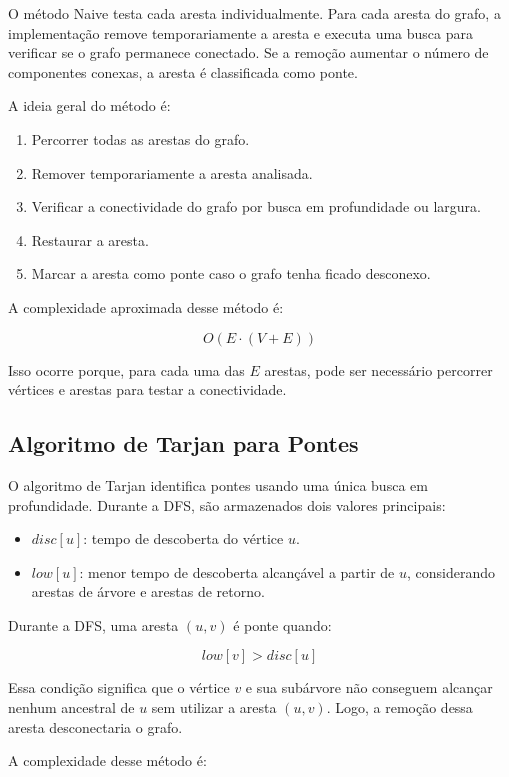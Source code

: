 \documentclass[a4paper,12pt]{article}
\begin{document}
O método Naive testa cada aresta individualmente. Para cada aresta do grafo, a implementação remove temporariamente a aresta e executa uma busca para verificar se o grafo permanece conectado. Se a remoção aumentar o número de componentes conexas, a aresta é classificada como ponte.

A ideia geral do método é:

\begin{enumerate}
    \item Percorrer todas as arestas do grafo.
    \item Remover temporariamente a aresta analisada.
    \item Verificar a conectividade do grafo por busca em profundidade ou largura.
    \item Restaurar a aresta.
    \item Marcar a aresta como ponte caso o grafo tenha ficado desconexo.
\end{enumerate}

A complexidade aproximada desse método é:

\[
O(E \cdot (V+E))
\]

Isso ocorre porque, para cada uma das $E$ arestas, pode ser necessário percorrer vértices e arestas para testar a conectividade.

\subsection{Algoritmo de Tarjan para Pontes}

O algoritmo de Tarjan identifica pontes usando uma única busca em profundidade. Durante a DFS, são armazenados dois valores principais:

\begin{itemize}
    \item $disc[u]$: tempo de descoberta do vértice $u$.
    \item $low[u]$: menor tempo de descoberta alcançável a partir de $u$, considerando arestas de árvore e arestas de retorno.
\end{itemize}

Durante a DFS, uma aresta $(u,v)$ é ponte quando:

\[
low[v] > disc[u]
\]

Essa condição significa que o vértice $v$ e sua subárvore não conseguem alcançar nenhum ancestral de $u$ sem utilizar a aresta $(u,v)$. Logo, a remoção dessa aresta desconectaria o grafo.

A complexidade desse método é:
\end{document}
